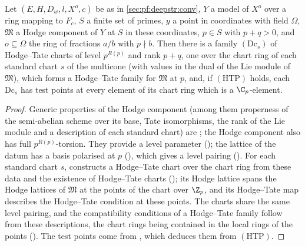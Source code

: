 \begin{theorem}\label{thm:pf:deepstr:htcharts}
Let $(E,H,D_w,l,X^o,c)$ be as in \cref{sec:pf:deepstr:conv}, $Y$ a model of $X^o$ over a ring mapping to $F_c$, $S$ a
finite set of primes, $y$ a point in coordinates with field $\Omega$, $\mathfrak M$ a Hodge component of $Y$ at $S$ in these
coordinates, $p\in S$ with $p+q>0$, and $o\subseteq\Omega$ the ring of fractions $a/b$ with $p\nmid b$. Then there is a family
$(\mathrm{Dc}_s)$ of Hodge--Tate charts of level $p^{R(p)}$ and rank $p+q$, one over the chart ring of each standard chart
$s$ of the multicone (with values in the dual of the Lie module of $\mathfrak M$), which forms a Hodge--Tate family for
$\mathfrak M$ at $p$, and, if $\mathrm{(HTP)}$ holds, each $\mathrm{Dc}_s$ has test points at every element of its chart ring
which is a $\C_p$-element.
\end{theorem}

\begin{proof}
Generic properties of the Hodge component (among them properness of the semi-abelian scheme over its
base, Tate isomorphisms, the rank of the Lie module and a description of each standard chart) are
; the Hodge component also has full $p^{R(p)}$-torsion.
They provide a level parameter (); the lattice of the datum
has a basis polarised at $p$ (), which gives a level pairing
(). For each standard chart $s$,
 constructs a Hodge--Tate chart over the chart ring
from these data and the existence of Hodge--Tate charts (); its
Hodge lattice spans the Hodge lattices of $\mathfrak M$ at the points of the chart over $\Z_p$, and its Hodge--Tate map
describes the Hodge--Tate condition at these points. The charts share the same level pairing, and the compatibility conditions of a
Hodge--Tate family follow from these descriptions, the chart rings being contained in the local rings of the
points (). The test points come from
, which deduces them from $\mathrm{(HTP)}$.
\end{proof}

